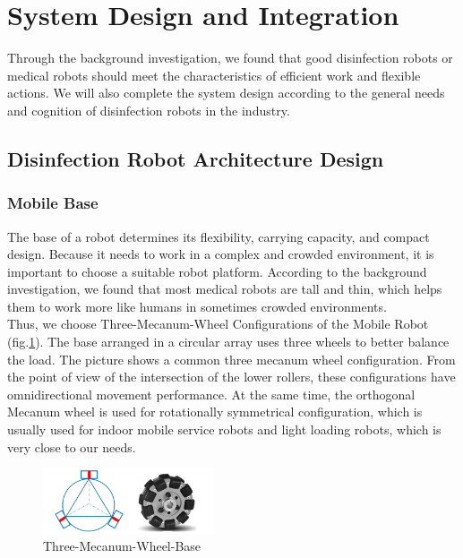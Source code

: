 \section{System Design and Integration}\label{Sec:method}


Through the background investigation, we found that good disinfection robots or medical robots should meet the characteristics of efficient work and flexible actions. We will also complete the system design according to the general needs and cognition of disinfection robots in the industry\cite{1717783}.

\subsection{Disinfection Robot Architecture Design}
\subsubsection{Mobile Base}
The base of a robot determines its flexibility, carrying capacity, and compact design. Because it needs to work in a complex and crowded environment, it is important to choose a suitable robot platform. According to the background investigation, we found that most medical robots are tall and thin, which helps them to work more like humans in sometimes crowded environments.\\
Thus, we choose Three-Mecanum-Wheel Configurations of the Mobile Robot (fig.\ref{tmw}). The base arranged in a circular array uses three wheels to better balance the load. The picture shows a common three mecanum wheel configuration. From the point of view of the intersection of the lower rollers, these configurations have omnidirectional movement performance. At the same time, the orthogonal Mecanum wheel is used for rotationally symmetrical configuration, which is usually used for indoor mobile service robots and light loading robots, which is very close to our needs.
\begin{figure}[htbp] 
\centering 
\includegraphics[width=0.45\textwidth]{figures/mwww.PNG} 
\caption{Three-Mecanum-Wheel-Base} 
\label{tmw} 
\end{figure}
